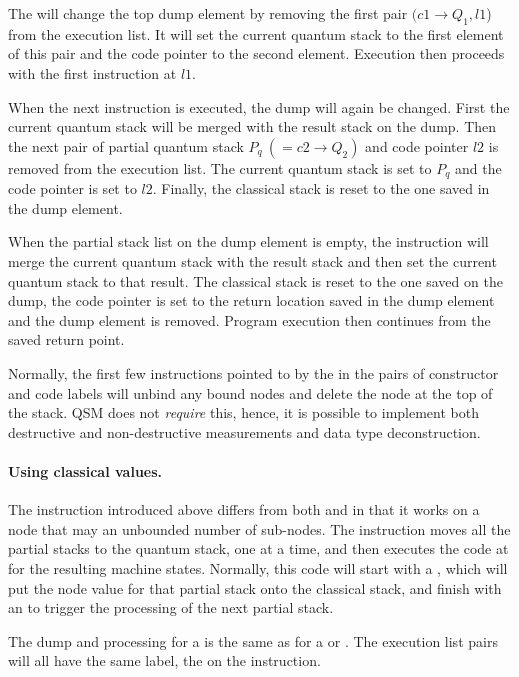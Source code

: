 The  will  change the top dump element
by removing the first pair $(c1\rightarrow Q_1, l1$) from the
execution list. It 
will set the current quantum stack to the first element of this
pair and the code pointer to the second element.
Execution then proceeds with the first instruction at $l1$.

When the next  instruction is executed, the dump will
again be changed. First the current quantum stack will be merged with
the result stack on the dump. Then the next pair of 
partial quantum stack $P_q\ (=c2\rightarrow Q_2) $ 
and code pointer $l2$ is removed from the execution list. 
The  current quantum stack is set to $P_q$ and the code pointer 
is set to $l2$. Finally, the classical stack is reset to the one 
saved in the dump element.

When the partial stack  list on the dump element is empty, 
the  instruction
will merge the current quantum stack with the result stack and then
set the current quantum stack to that result. 
The classical stack is reset to the one
saved on the dump, the code pointer is set to the return location
 saved in the
dump element and the dump element is removed. Program execution then
continues from the saved return point.

Normally, the first few instructions pointed to by the  in 
the pairs of constructor and code labels will unbind any bound nodes and 
delete the node at the top of the stack. 
QSM does not \emph{require} this, hence, it is possible to implement both
destructive and non-destructive measurements and data type deconstruction.

\paragraph{Using classical values.} The  instruction introduced
above differs from both  and  in that it works
on a node that may an unbounded number of sub-nodes.
The  instruction moves 
all the partial stacks to the quantum stack, one at a time, and then
executes the code at 
 for the resulting machine states. Normally, this 
code will start with a , which will put the node
value for that partial stack onto the
classical stack, and finish with an   to
 trigger the processing of the next partial stack.

The dump and  processing for a 
 is the same
as for a  or . The execution list pairs
will all have the same label, the  on the instruction.


